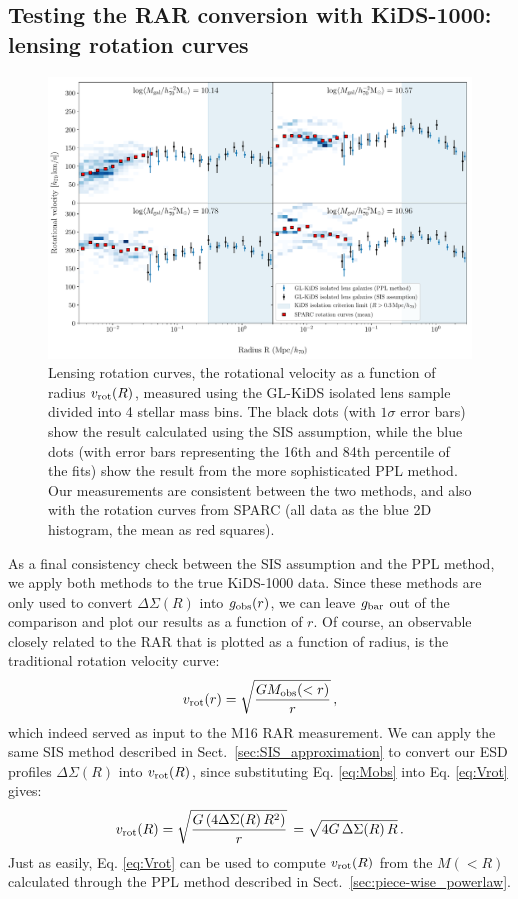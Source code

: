 \documentclass[usenatbib]{mnras}
\newcommand{\un}[1]{_{\rm #1}}
\begin{document}
\subsection{Testing the RAR conversion with KiDS-1000: lensing rotation curves}
\label{sec:results-rotation}

\begin{figure}
	\includegraphics[width=\textwidth]{Figures/ESD_KiDS_massbins-8p5_10p3_10p6_10p8_11p0_iso.pdf}
	\caption{Lensing rotation curves, the rotational velocity as a function of radius $v\un{rot}(R)$, measured using the GL-KiDS isolated lens sample divided into 4 stellar mass bins. The black dots (with $1\sigma$ error bars) show the result calculated using the SIS assumption, while the blue dots (with error bars representing the 16th and 84th percentile of the fits) show the result from the more sophisticated PPL method. Our measurements are consistent between the two methods, and also with the rotation curves from SPARC (all data as the blue 2D histogram, the mean as red squares).}
	\label{fig:Vrot_kids_verlinde_mice}
\end{figure}

As a final consistency check between the SIS assumption and the PPL method, we apply both methods to the true KiDS-1000 data. Since these methods are only used to convert $\Delta\Sigma(R)$ into $g\un{obs}(r)$, we can leave $g\un{bar}$ out of the comparison and plot our results as a function of $r$. Of course, an observable closely related to the RAR that is plotted as a function of radius, is the traditional rotation velocity curve:
\begin{equation}\label{eq:Vrot}
v\un{rot}(r) = \sqrt{\frac{G M\un{obs}(<r)}{r}} \, ,
\end{equation}
which indeed served as input to the M16 RAR measurement. We can apply the same SIS method described in Sect.~\ref{sec:SIS_approximation} to convert our ESD profiles $\Delta\Sigma(R)$ into $v\un{rot}(R)$, since substituting Eq. \ref{eq:Mobs} into Eq. \ref{eq:Vrot} gives:
\begin{equation}
v\un{rot}(R) = \sqrt{\frac{G \, (4 \Delta\Sigma(R) \, R^2)}{r}} \, = \sqrt{4 G \, \Delta\Sigma(R) \, R} \, .
\end{equation}
Just as easily, Eq. \ref{eq:Vrot} can be used to compute $v\un{rot}(R)$ from the $M(<R)$ calculated through the PPL method described in Sect.~\ref{sec:piece-wise_powerlaw}.
\end{document}
